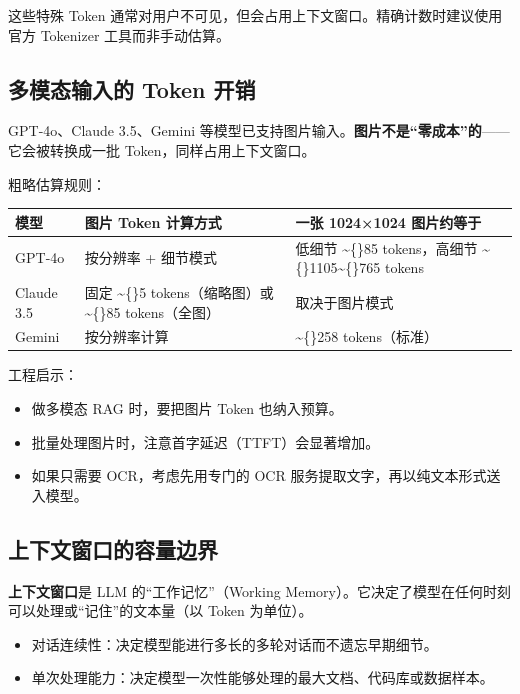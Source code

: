 \documentclass[10pt,a4paper]{ctexart}
\begin{document}
这些特殊 Token 通常对用户不可见，但会占用上下文窗口。精确计数时建议使用官方 Tokenizer 工具而非手动估算。



\subsection{多模态输入的 Token 开销}


GPT-4o、Claude 3.5、Gemini 等模型已支持图片输入。\textbf{图片不是“零成本”的}——它会被转换成一批 Token，同样占用上下文窗口。



粗略估算规则：


{\footnotesize
\begin{tabularx}{\textwidth}{|X|X|X|}
\hline
\textbf{模型} & \textbf{图片 Token 计算方式} & \textbf{一张 1024×1024 图片约等于} \\
\hline
GPT-4o & 按分辨率 + 细节模式 & 低细节 \textasciitilde\{\}85 tokens，高细节 \textasciitilde\{\}1105\textasciitilde\{\}765 tokens \\
\hline
Claude 3.5 & 固定 \textasciitilde\{\}5 tokens（缩略图）或 \textasciitilde\{\}85 tokens（全图） & 取决于图片模式 \\
\hline
Gemini & 按分辨率计算 & \textasciitilde\{\}258 tokens（标准） \\
\hline
\end{tabularx}
}



工程启示：


\begin{itemize}[itemsep=2pt, topsep=4pt]
  \item 做多模态 RAG 时，要把图片 Token 也纳入预算。
  \item 批量处理图片时，注意首字延迟（TTFT）会显著增加。
  \item 如果只需要 OCR，考虑先用专门的 OCR 服务提取文字，再以纯文本形式送入模型。
\end{itemize}


\subsection{上下文窗口的容量边界}


\textbf{上下文窗口}是 LLM 的“工作记忆”（Working Memory）。它决定了模型在任何时刻可以处理或“记住”的文本量（以 Token 为单位）。


\begin{itemize}[itemsep=2pt, topsep=4pt]
  \item 对话连续性：决定模型能进行多长的多轮对话而不遗忘早期细节。
  \item 单次处理能力：决定模型一次性能够处理的最大文档、代码库或数据样本。
\end{itemize}
\end{document}
